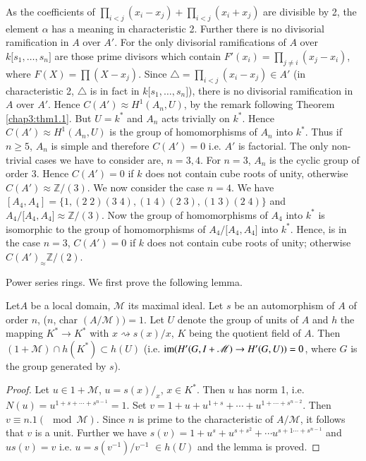 As the coefficients of $\prod\limits_{i < j}(x_i - x_j) +
  \prod\limits_{i < j} (x_i + x_j)$ are divisible by 2, the element
  $\alpha$ has a meaning in characteristic 2. Further there is no
  divisorial ramification in $A$ over $A'$. For the only divisorial
  ramifications of $A$ over $k \big[ s_1 , \ldots , s_n \big]$ are
  those prime divisors which contain $F' (x_i) = \prod\limits_{j \neq
    i}(x_j - x_i)$, where $F(X) = \prod (X- x_j)$. Since $\triangle =
  \prod\limits_{i < j} (x_i -x_j) \in A'$ (in characteristic 2,
  $\triangle$ is in fact in $k \big[s_1, \ldots , s_n \big]$), there
  is no divisorial ramification in $A$ over $A'$. Hence $C(A') \approx
  H^1 (A_n, U)$, by the remark following Theorem \ref{chap3:thm1.1}.
      But $U = k^*$ and $A_n$ acts trivially on $k^*$. Hence $C(A') \approx
H^1 (A_n, U)$ is the group of homomorphisms of $A_n$ into $k^*$. Thus
if $n \ge 5$, $A_n$ is simple and therefore $C(A') = 0$ i.e. $A'$ is
factorial. The only non-trivial cases we have to consider are, $n =
3,4$. For $n = 3$, $A_n$ is the cyclic group of order 3. Hence
$C(A') = 0$ if $k$ does not contain cube roots of unity, otherwise
$C(A') \approx \mathbb{Z}/(3)$. We now consider the case $n = 4$. We
have $[ A_4, A_4] = \big\{1, (2 \; 2) (3 \; 4), (1 \; 4) (2 \; 3), (1
\; 3) (2 \; 4) \big\}$ and  $A_4 \big/ \big[A_4, A_4 \big] \approx
\mathbb{Z}/  
(3)$. Now the group of homomorphisms of $A_4$ into $k^{\ast}$ is isomorphic
to the group of homomorphisms of $A_4 \big/ \big[A_4, A_4 \big]$
into $k^*$. Hence, is in the case $n = 3$, $C(A') = 0$ if $k$ does not
contain cube roots of unity; otherwise $C(A')_\approx \mathbb{Z}/
(2)$. 

           
\begin{example*} %
Power series rings. We first prove the following lemma.
\end{example*} 
       
\setcounter{lemma}{1}
\begin{lemma}%
Let\pageoriginale $A$ be a local domain, $\mathscr{M}$ its maximal
ideal. Let $s$ be 
an automorphism of $A$ of order $n$, ($n$, char $(A/\mathscr{M})) =
1$. Let $U$ denote the group of units of $A$ and $h$ the mapping $K^*
\to K^*$ with $x \rightsquigarrow s(x) / x$, $K$ being the quotient
field of $A$. Then $(1 +  \mathscr{M}) \cap h(K^*) \subset h(U)$
(i.e. $\operatorname{im} (H'(G, I  + \mathscr{M}) \to H'(G, U)) = 0$, where $G$ is 
the group generated by $s$). 
    \end{lemma}  
      
\begin{proof}
Let $u \in 1  +  \mathscr{M}$, $u = s(x)/_{x}$, $x \in K^*$. Then $u$
has norm 1, i.e. $N(u) = u^{1+s  +  \cdots + s^{n-1}} = 1$. Set
$v = 1 +  u + u^{1+s}+  \cdots + u^{1+ \cdots + s^{n-2}}$. Then $v
\equiv n.1 (\mod \mathscr{M})$. Since $n$ is prime to the
characteristic of $A/ \mathscr{M}$, it follows that $v$ is a
unit. Further we have $s (v) = 1+u^s + u^{s+s^2}+ \cdots u^{s+1
  \cdots + s^{n-1}}$ and $u s(v) = v$ i.e. $u = s(v^{-1}) \big/v^{-1}$
$\in h(U)$ and the lemma is proved.  
    \end{proof}    

